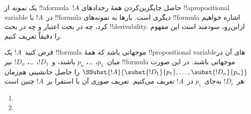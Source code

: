 \documentclass[../../../include/open-logic-section]{subfiles}
\begin{document}


یک \emph{نمونه} از !!a{formula}~$!A$ حاصل جایگزین‌کردن همهٔ رخدادهای
!!a{propositional variable} در~$!A$ با !!{formula} دیگری است. بارها به
نمونه‌های !!{formula} اشاره خواهیم کرد، چه در بحث اعتبار و چه در بحث
!!{derivability}. ازاین‌رو، سودمند است این مفهوم را دقیقاً تعریف کنیم.

\begin{defn}
  فرض کنید~$!A$ یک !!{formula} موجهاتی باشد که همهٔ !!{propositional
    variable}های آن در میان~$p_1$، \dots، $p_n$ باشند، و~$!D_1$،
  \dots، $!D_n$ نیز !!{formula} موجهاتی باشند. در این صورت
  $\SSubst{!A}{\subst{!D_1}{p_1}, \dots, \subst{!D_n}{p_n}}$ را حاصل
  جانشینی هم‌زمان هر~$!D_i$ به‌جای~$p_i$ در~$!A$ تعریف می‌کنیم. تعریف
  صوری آن با استقرا بر~$!A$ چنین است:
  \begin{enumerate}
    \item {}
    \item {}
\end{enumerate}
\end{defn}
\end{document}
